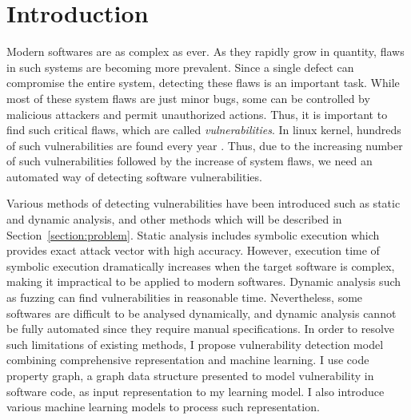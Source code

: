 \section{Introduction}
\label{section:introduction}

Modern softwares are as complex as ever. As they rapidly grow in quantity, flaws in such systems are becoming more prevalent.
Since a single defect can compromise the entire system, detecting these flaws is an important task.
While most of these system flaws are just minor bugs, some can be controlled by malicious attackers and permit unauthorized actions.
Thus, it is important to find such critical flaws, which are called \textit{vulnerabilities}.
%
In linux kernel, hundreds of such vulnerabilities are found every year \cite{cvelinux}.
Thus, due to the increasing number of such vulnerabilities followed by the increase of system flaws, we need an automated way of detecting software vulnerabilities.

Various methods of detecting vulnerabilities have been introduced such as static and dynamic analysis, and other methods which will be described in Section~\ref{section:problem}.
Static analysis includes symbolic execution which provides exact attack vector with high accuracy.
However, execution time of symbolic execution dramatically increases when the target software is complex, making it impractical to be applied to modern softwares.
Dynamic analysis such as fuzzing can find vulnerabilities in reasonable time.
Nevertheless, some softwares are difficult to be analysed dynamically, and dynamic analysis cannot be fully automated since they require manual specifications.
In order to resolve such limitations of existing methods, I propose vulnerability detection model combining comprehensive representation and machine learning.
I use code property graph, a graph data structure presented to model vulnerability in software code, as input representation to my learning model.
I also introduce various machine learning models to process such representation.


